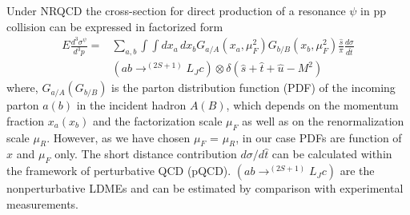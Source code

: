 \documentclass[aps,prc,preprint,superscriptaddress,showpacs,showkeys,amsmath]{revtex4-1}
\begin{document}
 
Under NRQCD the cross-section for direct production of a resonance $\psi$ in pp collision 
can be expressed in factorized form 
\begin{equation}
  \begin{split}
    E\frac{d^{3}\sigma^{\psi}}{d^{3}p} = &\sum_{a,b}\int \int dx_a\,dx_b 
    G_{a/A}(x_a,\mu_{F}^{2}) G_{b/B}(x_b,\mu_{F}^{2})\frac{\hat s}{\pi}\frac{d\sigma}{d\hat t}\\
    &(ab\rightarrow^{(2S+1)}L_{J}c) \otimes \delta(\hat s + \hat t + \hat u -M^{2}) 
\end{split}
\label{eqn:cross}
\end{equation}
where, $G_{a/A}(G_{b/B})$ is the parton distribution function (PDF) of the incoming parton $a(b)$ in the 
incident hadron $A(B)$, which depends on the momentum fraction $x_a(x_b)$ and the factorization 
scale $\mu_F$ as well as on the renormalization scale $\mu_R$. However, 
as we have chosen $\mu_F$ = $\mu_R$, in our case PDFs are function of $x$ and $\mu_F$ only. 
The short distance contribution $d\sigma/d\hat t$ can be calculated within the framework of perturbative 
QCD (pQCD). $(ab\rightarrow^{(2S+1)}L_{J}c)$ are the nonperturbative LDMEs and can be estimated by comparison 
with experimental measurements. 
\end{document}
